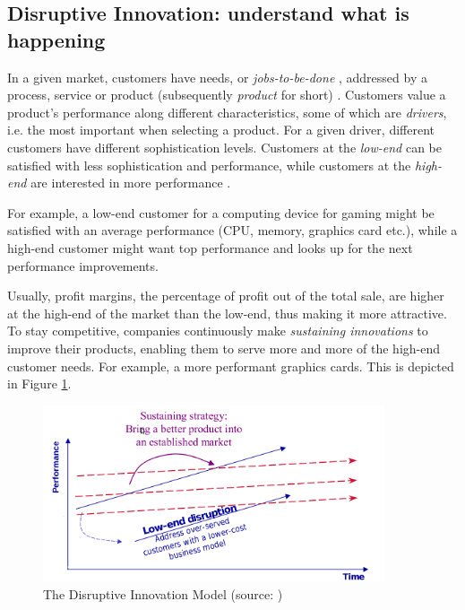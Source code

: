 \documentclass[a4paper,10pt]{book}
\begin{document}
\subsection{Disruptive Innovation: understand what is happening}
In a given market, customers have needs, or \emph{jobs-to-be-done} \cite{DisruptingClassExpandedEdition},
addressed by a process, service or product (subsequently \emph{product} for short) \cite{scientificArticlePredictingTheUnpredictable}.
Customers value a product's performance along different characteristics, some of which are \emph{drivers}, i.e. 
the most important when selecting a product. For a given driver, different customers have different sophistication levels. 
Customers at the \emph{low-end} can be satisfied with 
less sophistication and performance, while customers at the \emph{high-end} are interested in more performance \cite{innovatorsSolution}. 

For example, a low-end customer for a computing device for gaming might be satisfied with an average performance (CPU, memory, graphics card etc.), 
while a high-end customer might want top performance and looks up for the next performance improvements.

Usually, profit margins, the percentage of profit out of the total sale, are higher at the high-end of the market than the low-end, thus 
making it more attractive.
To stay competitive, companies continuously make \emph{sustaining innovations} to improve their products, enabling them to serve more and more of 
the high-end customer needs. For example, a more performant graphics cards. This is depicted in Figure \ref{fig:disruptiveInnovationModel}.\\

\begin{figure}[here]
\includegraphics[width=0.9\textwidth]{images/simpleDisruptiveInnovationModel.png}
 \caption{The Disruptive Innovation Model (source: \cite{innovatorsSolution})}
\label{fig:disruptiveInnovationModel}
\end{figure}
\end{document}

